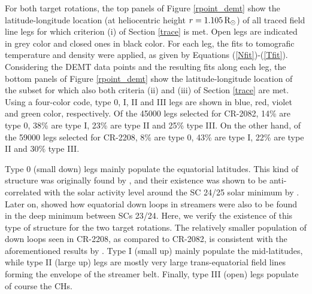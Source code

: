 \documentclass[namedreferences]{solarphysics}
\newcommand{\mrsun}{{\rm R_\odot}}
\def\notebyalbert#1{\textcolor{blue}{NOTE: #1}}
\begin{document}
\begin{article}
{For both target rotations, the top panels of Figure \ref{rpoint_demt} show the latitude-longitude location (at heliocentric height $r=1.105\,\mrsun$) of all traced field line legs for which criterion (i) of Section \ref{trace} is met. Open legs are indicated in grey color and closed ones in black color. For each leg, the fits to tomografic temperature and density were applied, as given by Equations (\ref{Nfit})-(\ref{Tfit}). Considering the DEMT data points and the resulting fits along each leg, the bottom panels of Figure \ref{rpoint_demt} show the latitude-longitude location of the subset for which also both criteria (ii) and (iii) of Section \ref{trace} are met. Using a four-color code, type 0, I, II and III legs are shown in blue, red, violet and green color, respectively.} {Of the 45000 legs selected for CR-2082, 14\% are type 0, 38\% are type I, 23\% are type II and 25\% type III. On the other hand, of the 59000 legs selected for CR-2208, 8\% are type 0, 43\% are type I, 22\% are type II and 30\% type III.}

{Type 0 (small down) legs mainly populate the equatorial latitudes. This kind of structure was originally found by \citet{huang_2012}, and their existence was shown to be anti-correlated with the solar activity level around the SC 24/25 solar minimum by \citet{nuevo_2013}. Later on, \citet{lloveras_2017} showed how equatorial down loops in streamers were also to be found in the deep minimum between SCs 23/24. Here, we verify the existence of this type of structure for the two target rotations. The relatively smaller population of down loops seen in CR-2208, as compared to CR-2082, is consistent with the aforementioned results by \citet{nuevo_2013}. Type I (small up) mainly populate the mid-latitudes, while type II (large up) legs are mostly very large trans-equatorial field lines forming the envelope of the streamer belt. Finally, type III (open) legs populate of course the CHs.}



\end{article}
\end{document}

